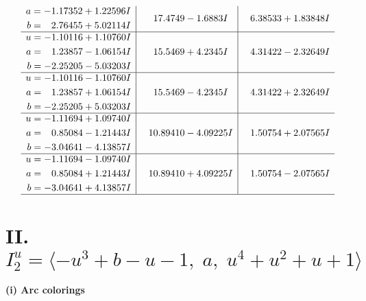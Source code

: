\documentclass[1p]{elsarticle_modified}
\theoremstyle{definition}
\begin{document}
$$\begin{array}{c|c|c}
\begin{aligned}
a &= -1.17352 + 1.22596 I \\
b &= \phantom{-}2.76455 + 5.02114 I\end{aligned}
 & \phantom{-}17.4749 - 1.6883 I & \phantom{-}6.38533 + 1.83848 I \\ \hline\begin{aligned}
u &= -1.10116 + 1.10760 I \\
a &= \phantom{-}1.23857 - 1.06154 I \\
b &= -2.25205 - 5.03203 I\end{aligned}
 & \phantom{-}15.5469 + 4.2345 I & \phantom{-}4.31422 - 2.32649 I \\ \hline\begin{aligned}
u &= -1.10116 - 1.10760 I \\
a &= \phantom{-}1.23857 + 1.06154 I \\
b &= -2.25205 + 5.03203 I\end{aligned}
 & \phantom{-}15.5469 - 4.2345 I & \phantom{-}4.31422 + 2.32649 I \\ \hline\begin{aligned}
u &= -1.11694 + 1.09740 I \\
a &= \phantom{-}0.85084 - 1.21443 I \\
b &= -3.04641 - 4.13857 I\end{aligned}
 & \phantom{-}10.89410 - 4.09225 I & \phantom{-}1.50754 + 2.07565 I \\ \hline\begin{aligned}
u &= -1.11694 - 1.09740 I \\
a &= \phantom{-}0.85084 + 1.21443 I \\
b &= -3.04641 + 4.13857 I\end{aligned}
 & \phantom{-}10.89410 + 4.09225 I & \phantom{-}1.50754 - 2.07565 I\\
 \hline 
 \end{array}$$\newpage\newpage\renewcommand{\arraystretch}{1}
\centering \section*{II. $I^u_{2}= \langle - u^3+b- u-1,\;a,\;u^4+u^2+u+1 \rangle$}
\flushleft \textbf{(i) Arc colorings}\\
\end{document}
